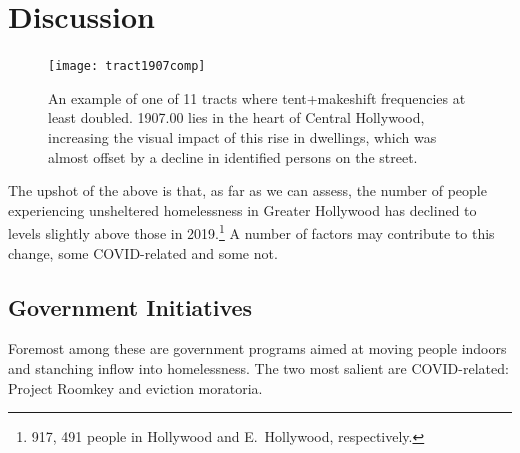 \documentclass[11pt,twocolumn]{article}
\def\resp{respectively}
\begin{document}
%
%
%

\section{Discussion}
\label{sec:discussion}

\begin{figure}[t]
	\centering
	\texttt{[image: tract1907comp]}
	\caption{An example of one of 11 tracts where tent+makeshift frequencies at least 
			doubled. 1907.00 lies in the heart of Central Hollywood, increasing the visual impact of this
			rise in dwellings, which was almost offset by a decline in identified persons
			on the street.}
	\label{fig:1907}
\end{figure}

The upshot of the above is that, as far as we can assess, the number of people experiencing unsheltered
homelessness in Greater Hollywood has declined to levels slightly above those in 2019.\footnote{917, 491 
people in Hollywood and E.~Hollywood, \resp.} A number of factors may contribute to this change, some 
COVID-related and some not.

\subsection{Government Initiatives}

Foremost among these are government programs aimed at moving people indoors and stanching inflow into 
homelessness. The two most salient are COVID-related: Project Roomkey and eviction moratoria.
\end{document}
